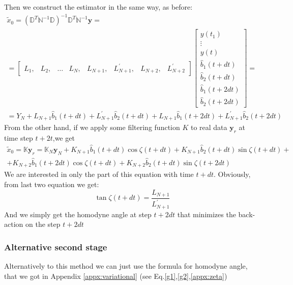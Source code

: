 Then we construct the estimator in the same way, as before:
\begin{multline}
 \tilde{x}_0 = (\mathbb{D}^T\mathbb{N}^{-1}\mathbb{D})^{-1}\mathbb{D}^T\mathbb{N}^{-1}\mathbf{y} = \\ =
\begin{bmatrix}
 L_1, & L_2, & \hdots & L_N, & L_{N+1}, & L_{N+1}^{'}, & L_{N+2}, & L_{N+2}^{'}
\end{bmatrix}
\begin{bmatrix}
 y(t_1)\\\vdots\\ y(t) \\ \hat{b}_1(t+dt)\\ \hat{b}_2(t+dt)\\ \hat{b}_1(t+2dt)\\ \hat{b}_2(t+2dt)
\end{bmatrix}
=\\ =Y_N + L_{N+1}\hat{b}_1(t+dt)+L_{N+1}^{'}\hat{b}_2(t+dt)+L_{N+1}\hat{b}_1(t+2dt)+L_{N+1}^{'}\hat{b}_2(t+2dt)
\end{multline}
From the other hand, if we apply some filtering function $K$ to real data $\mathbf{y}_r$ at time step $t+2t$,we get
\begin{multline}
 \tilde{x}_0 = \mathbb{K}\mathbf{y}_r = \mathbb{K}_N\mathbf{y}_N + K_{N+1}\hat{b}_1(t+dt)\cos\zeta(t+dt)+K_{N+1}\hat{b}_2(t+dt)\sin\zeta(t+dt)+\\+ K_{N+2}\hat{b}_1(t+2dt)\cos\zeta(t+dt)+K_{N+2}\hat{b}_2(t+dt)\sin\zeta(t+2dt)
\end{multline}
We are interested in only the part of this equation with time $t+dt$. Obviously, from last two equation we get:
\begin{equation}
 \tan \zeta(t+dt) = \frac{L_{N+1}}{L_{N+1}^{'}}
\end{equation}
And we simply get the homodyne angle at step $t+2dt$ that minimizes the back-action on the step $t+2dt$

\subsubsection{Alternative second stage}
Alternatively to this method we can just use the formula for homodyne angle, that we got in Appendix \ref{appx:variational} (see Eq.\ref{g1},\ref{g2},\ref{appx:zeta})
